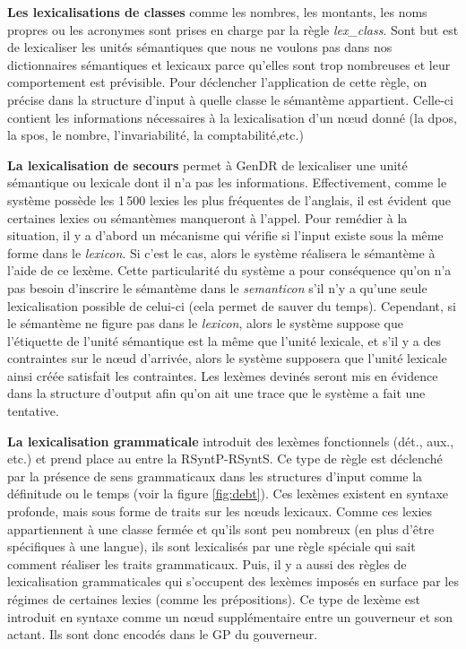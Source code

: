 \textbf{Les lexicalisations de classes}
comme les nombres, les montants, les noms propres ou les acronymes sont prises en charge par la règle \emph{lex\_class}. Sont but est de lexicaliser les unités sémantiques que nous ne voulons pas dans nos dictionnaires sémantiques et lexicaux parce qu'elles sont trop nombreuses et leur comportement est prévisible. Pour déclencher l'application de cette règle, on précise dans la structure d'input à quelle classe le sémantème appartient. Celle-ci contient les informations nécessaires à la lexicalisation d'un n\oe{}ud donné (la \ac{dpos}, la \ac{spos}, le nombre, l'invariabilité, la comptabilité,etc.)

\textbf{La lexicalisation de secours} 
permet à GenDR de lexicaliser une unité sémantique ou lexicale dont il n'a pas les informations. Effectivement, comme le système possède les 1\,500 lexies les plus fréquentes de l'anglais, il est évident que certaines lexies ou sémantèmes manqueront à l'appel. Pour remédier à la situation, il y a d'abord un mécanisme qui vérifie si l'input existe sous la même forme dans le \emph{lexicon}. Si c'est le cas, alors le système réalisera le sémantème à l'aide de ce lexème. Cette particularité du système a pour conséquence qu'on n'a pas besoin d'inscrire le sémantème dans le \emph{semanticon} s'il n'y a qu'une seule lexicalisation possible de celui-ci (cela permet de sauver du temps). Cependant, si le sémantème ne figure pas dans le \emph{lexicon}, alors le système suppose que l'étiquette de l'unité sémantique est la même que l'unité lexicale, et s'il y a des contraintes sur le n\oe{}ud d'arrivée, alors le système supposera que l'unité lexicale ainsi créée satisfait les contraintes. Les lexèmes devinés seront mis en évidence dans la structure d'output afin qu'on ait une trace que le système a fait une tentative.

\textbf{La lexicalisation grammaticale}
introduit des lexèmes fonctionnels (dét., aux., etc.) et prend place au entre la \ac{RSyntP}-\ac{RSyntS}. Ce type de règle est déclenché par la présence de sens grammaticaux dans les structures d'input comme la définitude ou le temps (voir la figure \ref{fig:debt}). Ces lexèmes existent en syntaxe profonde, mais sous forme de traits sur les n\oe{}uds lexicaux. Comme ces lexies appartiennent à une classe fermée et qu'ils sont peu nombreux (en plus d'être spécifiques à une langue), ils sont lexicalisés par une règle spéciale qui sait comment réaliser les traits grammaticaux. Puis, il y a aussi des règles de lexicalisation grammaticales qui s'occupent des lexèmes imposés en surface par les régimes de certaines lexies (comme les prépositions). Ce type de lexème est introduit en syntaxe comme un n\oe{}ud supplémentaire entre un gouverneur et son actant. Ils sont donc encodés dans le \ac{GP} du gouverneur. 

